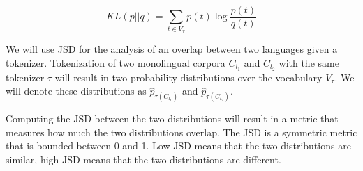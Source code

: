 \begin{equation}
    KL(p||q) = \sum_{t \in V_\tau} p(t) \log \frac{p(t)}{q(t)}
\end{equation}

We will use JSD for the analysis of an overlap between two languages given a tokenizer. Tokenization of two monolingual corpora $C_{l_1}$ and $C_{l_2}$ with the same tokenizer $\tau$ will result in two probability distributions over the vocabulary $V_\tau$. We will denote these distributions as $\hat{p}_{\tau(C_{l_1})}$ and $\hat{p}_{\tau(C_{l_2})}$. 

Computing the JSD between the two distributions will result in a metric that measures how much the two distributions overlap. The JSD is a symmetric metric that is bounded between 0 and 1. Low JSD means that the two distributions are similar, high JSD means that the two distributions are different. 







